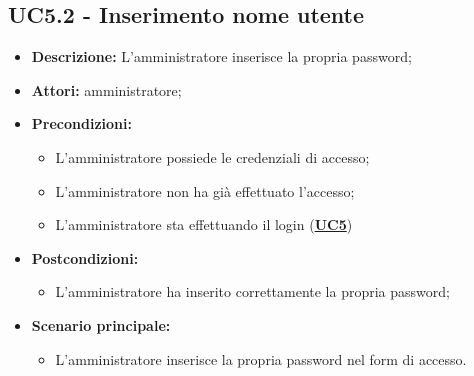 \documentclass[5pt]{article}
\begin{document}
\subsection{UC5.2 - Inserimento nome utente}
\label{sec:UC5.2}
\begin{itemize}
    \item \textbf{Descrizione:} L’amministratore inserisce la propria password;
    \item \textbf{Attori:} amministratore;
    \item \textbf{Precondizioni:} 
    \begin{itemize}
        \item L’amministratore possiede le credenziali di accesso;
        \item L’amministratore non ha già effettuato l’accesso;
        \item L’amministratore sta effettuando il login (\hyperref[sec:UC5]{\textbf{UC5}})
    \end{itemize}
    \item \textbf{Postcondizioni:} 
    \begin{itemize}
        \item L’amministratore ha inserito correttamente la propria password;
    \end{itemize}
    \item \textbf{Scenario principale:} 
    \begin{itemize}
        \item L’amministratore inserisce la propria password nel form di accesso.
    \end{itemize}
\end{itemize}
\end{document}
